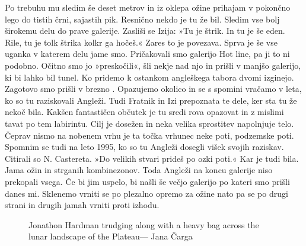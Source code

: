 Po trebuhu mu sledim še deset metrov in iz oklepa ožine prihajam v pokončno lego do tistih črni, sajastih pik. Resnično nekdo je tu že bil. Sledim vse bolj širokemu delu do prave galerije. Zasliši se Izija: »Tu je štrik. In tu je še eden. Rile, tu je tolk štrika kolkr ga hočeš.« Zares to je povezava. Sprva je še vse uganka v katerem delu jame smo. Pričakovali smo galerijo Hot line, pa ji to ni podobno. Očitno smo jo »preskočili«, šli nekje nad njo in prišli v manjšo galerijo, ki bi lahko bil  tunel. Ko pridemo k ostankom  angleškega tabora dvomi izginejo.  Zagotovo smo prišli  v brezno . Opazujemo okolico in se s spomini vračamo v leta, ko so tu raziskovali Angleži. Tudi Fratnik in Izi prepoznata te dele, ker sta tu že nekoč bila. Kakšen fantastičen občutek je tu sredi rova opazovat in z mislimi tavat po tem labirintu. Cilj je dosežen in neka velika sprostitev napolnjuje telo. Čeprav nismo na nobenem vrhu je ta točka vrhunec neke poti, podzemske poti. Spomnim se tudi na leto 1995, ko so tu Angleži dosegli višek svojih raziskav. Citirali so N. Castereta. »Do velikih stvari prideš po ozki poti.« Kar je  tudi bila. Jama ožin in strganih kombinezonov. Toda Angleži na koncu galerije niso prekopali vsega. Če bi jim uspelo, bi našli še večjo galerijo po kateri smo prišli danes mi. 
  Sklenemo vrniti se po plezalno opremo za ožine nato pa se po drugi strani in drugih jamah vrniti proti izhodu. 
\begin{figure}[t!]
\checkoddpage \ifoddpage \forcerectofloat \else \forceversofloat \fi
\centering
{}
\caption{Jonathon Hardman trudging along with a heavy bag across the lunar landscape of the  Plateau--- Jana Čarga }
\label{mig surface jon hardman}
\end{figure}

